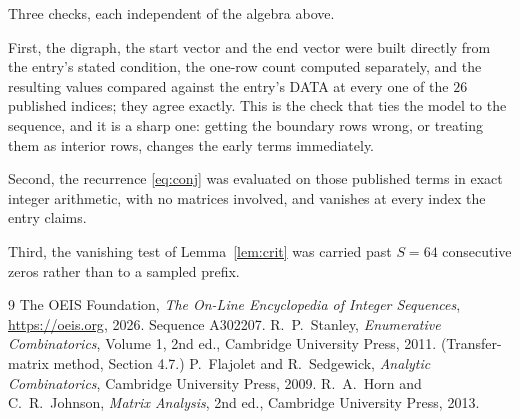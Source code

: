 \documentclass[11pt,a4paper]{article}
\theoremstyle{plain}
\theoremstyle{definition}
\begin{document}
Three checks, each independent of the algebra above.

First, the digraph, the start vector and the end vector were built directly from the
entry's stated condition, the one-row count computed separately, and the resulting values
compared against the entry's DATA at every one of the $26$ published indices; they
agree exactly. This is the check that ties the model to the sequence, and it is a sharp one:
getting the boundary rows wrong, or treating them as interior rows, changes the early terms
immediately.

Second, the recurrence \eqref{eq:conj} was evaluated on those published terms in exact
integer arithmetic, with no matrices involved, and vanishes at every index the entry claims.

Third, the vanishing test of Lemma~\ref{lem:crit} was carried past $S=64$ consecutive
zeros rather than to a sampled prefix.

\begin{thebibliography}{9}
 The OEIS Foundation, \emph{The On-Line Encyclopedia of Integer
Sequences}, \url{https://oeis.org}, 2026. Sequence A302207.
 R.~P.~Stanley, \emph{Enumerative Combinatorics}, Volume 1, 2nd ed.,
Cambridge University Press, 2011. (Transfer-matrix method, Section 4.7.)
 P.~Flajolet and R.~Sedgewick, \emph{Analytic Combinatorics}, Cambridge
University Press, 2009.
 R.~A.~Horn and C.~R.~Johnson, \emph{Matrix Analysis}, 2nd ed., Cambridge
University Press, 2013.
\end{thebibliography}
\end{document}
